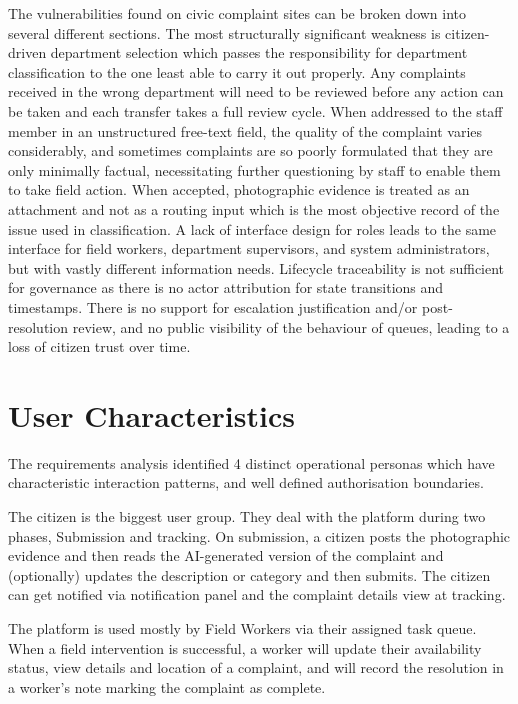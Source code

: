 The vulnerabilities found on civic complaint sites can be broken down into several different sections. The most structurally significant weakness is citizen-driven department selection which passes the responsibility for department classification to the one least able to carry it out properly. Any complaints received in the wrong department will need to be reviewed before any action can be taken and each transfer takes a full review cycle. When addressed to the staff member in an unstructured free-text field, the quality of the complaint varies considerably, and sometimes complaints are so poorly formulated that they are only minimally factual, necessitating further questioning by staff to enable them to take field action. When accepted, photographic evidence is treated as an attachment and not as a routing input which is the most objective record of the issue used in classification. A lack of interface design for roles leads to the same interface for field workers, department supervisors, and system administrators, but with vastly different information needs. Lifecycle traceability is not sufficient for governance as there is no actor attribution for state transitions and timestamps. There is no support for escalation justification and/or post-resolution review, and no public visibility of the behaviour of queues, leading to a loss of citizen trust over time.

\Needspace{0.9\textheight}
\section{User Characteristics}

The requirements analysis identified 4 distinct operational personas which have characteristic interaction patterns, and well defined authorisation boundaries.

The citizen is the biggest user group. They deal with the platform during two phases, Submission and tracking. On submission, a citizen posts the photographic evidence and then reads the AI-generated version of the complaint and (optionally) updates the description or category and then submits. The citizen can get notified via notification panel and the complaint details view at tracking.

The platform is used mostly by Field Workers via their assigned task queue. When a field intervention is successful, a worker will update their availability status, view details and location of a complaint, and will record the resolution in a worker's note marking the complaint as complete.

